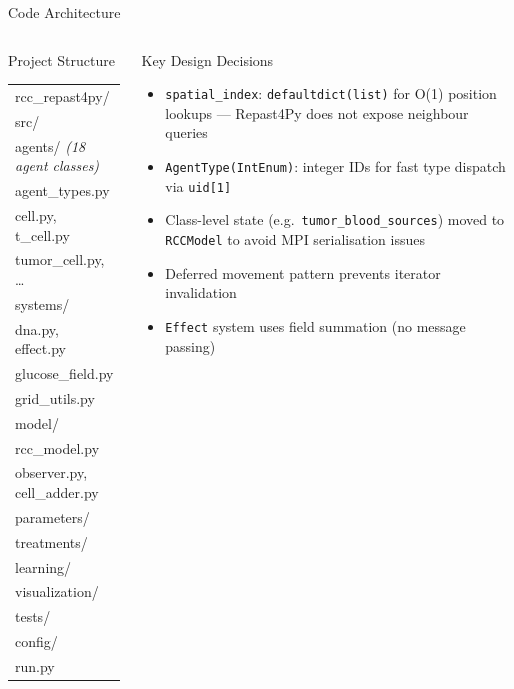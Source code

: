 \documentclass[aspectratio=169,10pt]{beamer}
\begin{document}
\begin{frame}{Code Architecture}
  \begin{columns}[T]
    \begin{block}{Project Structure}
      \ttfamily\scriptsize
      \begin{tabular}{@{}l@{}}
        rcc\_repast4py/ \\
        \quad src/ \\
        \quad\quad agents/ \quad\textit{(18 agent classes)} \\
        \quad\quad\quad agent\_types.py \\
        \quad\quad\quad cell.py, t\_cell.py \\
        \quad\quad\quad tumor\_cell.py, \ldots \\
        \quad\quad systems/ \\
        \quad\quad\quad dna.py, effect.py \\
        \quad\quad\quad glucose\_field.py \\
        \quad\quad\quad grid\_utils.py \\
        \quad\quad model/ \\
        \quad\quad\quad rcc\_model.py \\
        \quad\quad\quad observer.py, cell\_adder.py \\
        \quad\quad parameters/ \\
        \quad\quad treatments/ \\
        \quad\quad learning/ \\
        \quad\quad visualization/ \\
        \quad tests/ \\
        \quad config/ \\
        \quad run.py \\
      \end{tabular}
    \end{block}

    \begin{block}{Key Design Decisions}
      \begin{itemize}
        \item \texttt{spatial\_index}: \texttt{defaultdict(list)} for O(1) position lookups --- Repast4Py does not expose neighbour queries
        \item \texttt{AgentType(IntEnum)}: integer IDs for fast type dispatch via \texttt{uid[1]}
        \item Class-level state (e.g.\ \texttt{tumor\_blood\_sources}) moved to \texttt{RCCModel} to avoid MPI serialisation issues
        \item Deferred movement pattern prevents iterator invalidation
        \item \texttt{Effect} system uses field summation (no message passing)
      \end{itemize}
    \end{block}
  \end{columns}
\end{frame}
\end{document}
